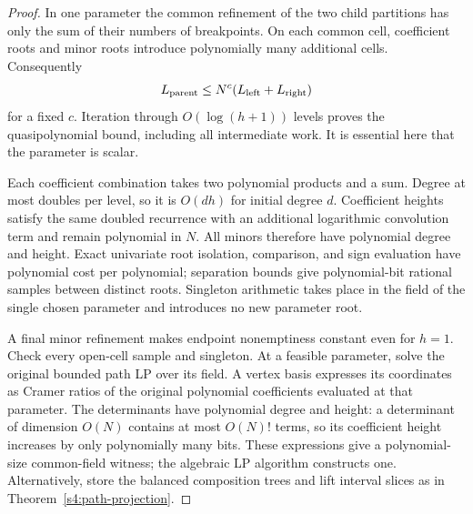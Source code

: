 \begin{proof}
In one parameter the common refinement of the two child partitions has
only the sum of their numbers of breakpoints. On each common cell,
coefficient roots and minor roots introduce polynomially many additional
cells. Consequently
\[
 L_{\rm parent}\le N^c(L_{\rm left}+L_{\rm right})
\]
for a fixed $c$. Iteration through $O(\log(h+1))$ levels proves the
quasipolynomial bound, including all intermediate work. It is essential
here that the parameter is scalar.

Each coefficient combination takes two polynomial products and a sum.
Degree at most doubles per level, so it is $O(dh)$ for initial degree
$d$. Coefficient heights satisfy the same doubled recurrence with an
additional logarithmic convolution term and remain polynomial in $N$.
All minors therefore have polynomial degree and height. Exact univariate
root isolation, comparison, and sign evaluation have polynomial cost
per polynomial; separation bounds give polynomial-bit rational samples
between distinct roots. Singleton arithmetic takes place in the field
of the single chosen parameter and introduces no new parameter root.

A final minor refinement makes endpoint nonemptiness constant even for
$h=1$. Check every open-cell sample and singleton. At a feasible
parameter, solve the original bounded path LP over its field. A vertex
basis expresses its coordinates as Cramer ratios of the original
polynomial coefficients evaluated at that parameter. The determinants
have polynomial degree and height: a determinant of dimension $O(N)$
contains at most $O(N)!$ terms, so its coefficient height increases by
only polynomially many bits. These expressions give a polynomial-size
common-field witness; the algebraic LP algorithm constructs one.
Alternatively, store the balanced composition trees and lift interval
slices as in Theorem~\ref{s4:path-projection}.
\end{proof}

